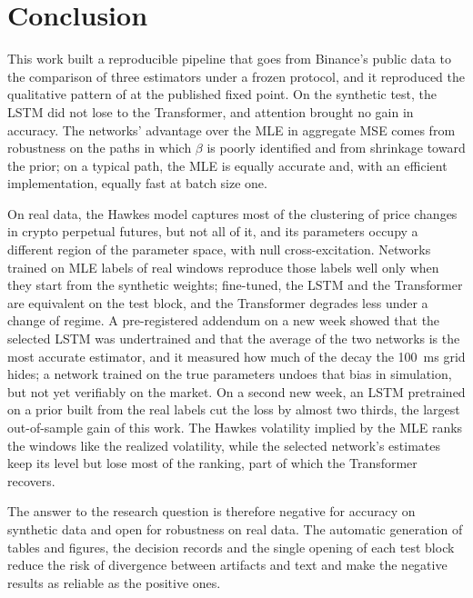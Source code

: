 \chapter{Conclusion}

This work built a reproducible pipeline that goes from Binance's public data to the
comparison of three estimators under a frozen protocol, and it reproduced the
qualitative pattern of \citet{lee2023} at the published fixed point. On the synthetic
test, the LSTM did not lose to the Transformer, and attention brought no gain in
accuracy. The networks' advantage over the MLE in aggregate MSE comes from robustness
on the paths in which \(\beta\) is poorly identified and from shrinkage toward the
prior; on a typical path, the MLE is equally accurate and, with an efficient
implementation, equally fast at batch size one.

On real data, the Hawkes model captures most of the clustering of price changes in crypto
perpetual futures, but not all of it, and its parameters occupy a different region of the
parameter space, with null cross-excitation. Networks trained on MLE labels of real windows
reproduce those labels well only when they start from the synthetic weights; fine-tuned,
the LSTM and the Transformer are equivalent on the test block, and the Transformer degrades
less under a change of regime. A pre-registered addendum on a new week showed that the selected
LSTM was undertrained and that the average of the two networks is the most accurate
estimator, and it measured how much of the decay the 100~ms grid hides; a network trained on
the true parameters undoes that bias in simulation, but not yet verifiably on the market. On a
second new week,
an LSTM pretrained on a prior built from the real labels cut the loss by almost two thirds,
the largest out-of-sample gain of this work. The Hawkes volatility implied by the MLE ranks
the windows like the realized volatility, while the selected network's estimates keep its
level but lose most of the ranking, part of which the Transformer recovers.

The answer to the research question is therefore negative for accuracy on synthetic data
and open for robustness on real data. The automatic generation of tables and figures, the
decision records and the single opening of each test block reduce the risk of divergence
between artifacts and text and make the negative results as reliable as the positive ones.
